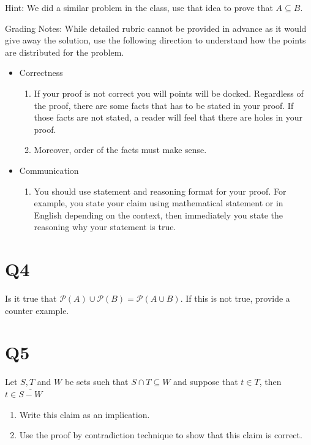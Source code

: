 \documentclass[12pt]{exam}
\begin{document}
Hint: We did a similar problem in the class, use that idea to prove that $A \subseteq B$.

Grading Notes:
While detailed rubric cannot be provided in advance as it would give away the solution, use the following direction to understand how the points are distributed for the problem.
\begin{itemize}
    \item Correctness
    \begin{enumerate}
        \item If your proof is not correct you will points will be docked. Regardless of the proof, there are some facts that has to be stated in your proof. If those facts are not stated, a reader will feel that there are holes in your proof. 
        \item Moreover, order of the facts must make sense. 
    \end{enumerate}
        
    \item Communication 
        \begin{enumerate}
            \item You should use statement and reasoning format for your proof. For example, you state your claim using mathematical statement or in English depending on the context, then immediately you state the reasoning why your statement is true.
        \end{enumerate}
\end{itemize}

\section{Q4}
Is it true that $\mathcal{P}(A) \cup \mathcal{P}(B) = \mathcal{P}(A \cup B)$. If this is not true, provide a counter example.


\section{Q5}
Let $S,T$ and $W$ be sets such that $S \cap T \subseteq W$ and suppose that $t \in T$, then $t \in \overline{S - W}$

\begin{enumerate}
    \item Write this claim as an implication.
    \item Use the proof by contradiction technique to show that this claim is correct.
\end{enumerate}
\end{document}
